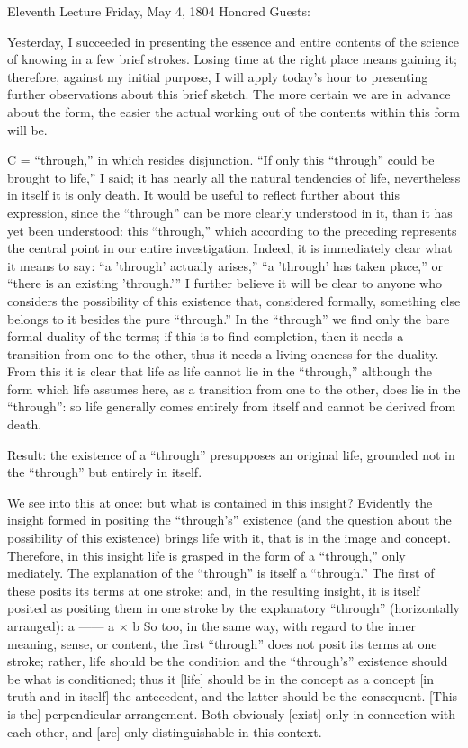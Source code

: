 Eleventh Lecture
Friday, May 4, 1804
Honored Guests:

Yesterday, I succeeded in presenting the essence
and entire contents of the science of knowing
in a few brief strokes.
Losing time at the right place means gaining it;
therefore, against my initial purpose,
I will apply today's hour to presenting
further observations about this brief sketch.
The more certain we are in advance about the form,
the easier the actual working out
of the contents within this form will be.

C = “through,” in which resides disjunction.
“If only this “through” could be brought to life,” I said;
it has nearly all the natural tendencies of life,
nevertheless in itself it is only death.
It would be useful to reflect further about this expression,
since the “through” can be more clearly understood in it,
than it has yet been understood:
this “through,” which according to the preceding
represents the central point in our entire investigation.
Indeed, it is immediately clear
what it means to say:
“a 'through' actually arises,”
“a 'through' has taken place,”
or “there is an existing 'through.'”
I further believe it will be clear
to anyone who considers the possibility of this existence that,
considered formally, something else belongs to it
besides the pure “through.”
In the “through” we find only
the bare formal duality of the terms;
if this is to find completion,
then it needs a transition from one to the other,
thus it needs a living oneness for the duality.
From this it is clear that life as life cannot lie in the “through,”
although the form which life assumes here,
as a transition from one to the other,
does lie in the “through”:
so life generally comes entirely from itself
and cannot be derived from death.

Result: the existence of a “through”
presupposes an original life,
grounded not in the “through”
but entirely in itself.

We see into this at once:
but what is contained in this insight?
Evidently the insight formed in positing
the “through's” existence
(and the question about the possibility of this existence)
brings life with it,
that is in the image and concept.
Therefore, in this insight life is grasped
in the form of a “through,” only mediately.
The explanation of the “through” is itself a “through.”
The first of these posits its terms at one stroke;
and, in the resulting insight,
it is itself posited as positing them in one stroke
by the explanatory “through” (horizontally arranged):
a
——
a × b
So too, in the same way, with regard to
the inner meaning, sense, or content,
the first “through” does not posit
its terms at one stroke;
rather, life should be the condition
and the “through's” existence should be
what is conditioned;
thus it [life] should be in the concept as a concept
[in truth and in itself] the antecedent,
and the latter should be the consequent.
[This is the] perpendicular arrangement.
Both obviously [exist] only in connection with
each other, and [are] only distinguishable in this context.

